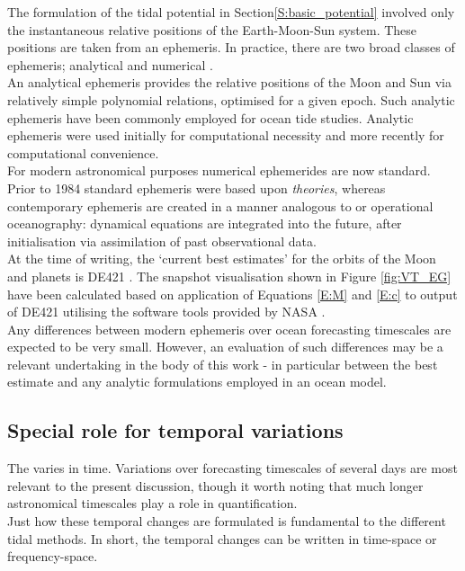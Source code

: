 The formulation of the tidal potential in Section\ref{S:basic_potential} involved only the instantaneous relative positions of the Earth-Moon-Sun system.   These positions are taken from an ephemeris.  In practice, there are two broad classes of ephemeris; analytical and numerical \citep{Wenzel:1997kn}.\\
An analytical ephemeris provides the relative positions of the Moon and Sun via relatively simple polynomial relations, optimised for a given epoch.  Such analytic ephemeris have been commonly employed for ocean tide studies.   Analytic ephemeris were used initially for computational necessity and more recently for computational convenience.\\
For modern astronomical purposes numerical ephemerides are now standard.  Prior to 1984 standard ephemeris were based upon \emph{theories}\cite[sec 8.1]{Urban:2013vl}, whereas contemporary ephemeris are created in a manner analogous to \NWP{} or operational oceanography: dynamical equations are integrated into the future, after initialisation via assimilation of past observational data.\\
At the time of writing, the `current best estimates' for the orbits of the Moon and planets is DE421 \citep{Folkner:2008wm}.   The snapshot visualisation shown in Figure \ref{fig:VT_EG} have been calculated based on application of Equations \ref{E:M} and \ref{E:c} to output of DE421 utilising the software tools provided by NASA \cite[p]{Anonymous:vo}.\\
Any differences between modern ephemeris over ocean forecasting timescales are expected to be very small.   However, an evaluation of such differences may be a relevant undertaking in the body of this work - in particular between the best estimate and any analytic formulations employed in an ocean model.



\subsection{Special role for temporal variations}
The \ATGP{} varies in time.  Variations over forecasting timescales of several days are most relevant to the present discussion, though it worth noting that much longer astronomical timescales play a role in quantification.\\
Just how these temporal changes are formulated is fundamental to the different tidal methods.   In short, the temporal changes can be written in time-space or frequency-space.\\



